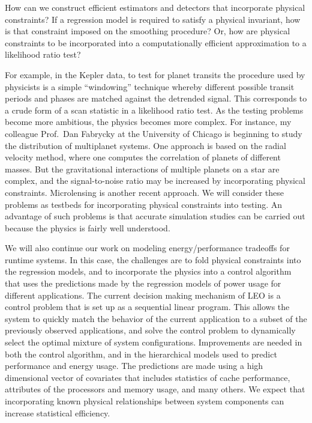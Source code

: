 How can we construct efficient estimators and detectors that incorporate 
physical constraints?  If a regression model is required to
satisfy a physical invariant, how is that constraint imposed
on the smoothing procedure?   Or, how are physical constraints to be
incorporated into a computationally efficient approximation to a
likelihood ratio test?  

For example, in the Kepler data, to test for planet transits the
procedure used by physicists is a simple ``windowing'' technique
whereby different possible transit periods and phases are matched
against the detrended signal.  This corresponds to a crude form of a
scan statistic in a likelihood ratio test.  As the testing problems
become more ambitious, the physics becomes more complex.  For
instance, my colleague Prof.~Dan Fabrycky at the University of Chicago
is beginning to study the distribution of multiplanet systems.  One
approach is based on the radial velocity method, where one computes
the correlation of planets of different masses.  But the gravitational
interactions of multiple planets on a star are complex, and the
signal-to-noise ratio may be increased by incorporating physical
constraints. Microlensing is another recent approach.  We will
consider these problems as testbeds for incorporating physical
constraints into testing.  An advantage of such problems is that
accurate simulation studies can be carried out because the physics is
fairly well understood.


We will also continue our work on modeling energy/performance
tradeoffs for runtime systems.  In this case, the
challenges are to fold physical constraints into the
regression models, and to incorporate the
physics into a control algorithm that uses the
predictions made by the regression models
of power usage for different applications.  
The current decision making mechanism of LEO is a control problem that is set up
as a sequential linear program.  This allows the system to quickly match the
behavior of the current application to a subset of the previously
observed applications, and solve the control problem to dynamically
select the optimal mixture of system configurations.  Improvements
are needed in both the control algorithm, and in the hierarchical
models used to predict performance and energy usage.
The predictions are made using a high dimensional vector of covariates
that includes statistics of cache performance, attributes
of the processors and memory usage, and many others.
We expect that incorporating known physical relationships between system
components can increase statistical efficiency.



%
